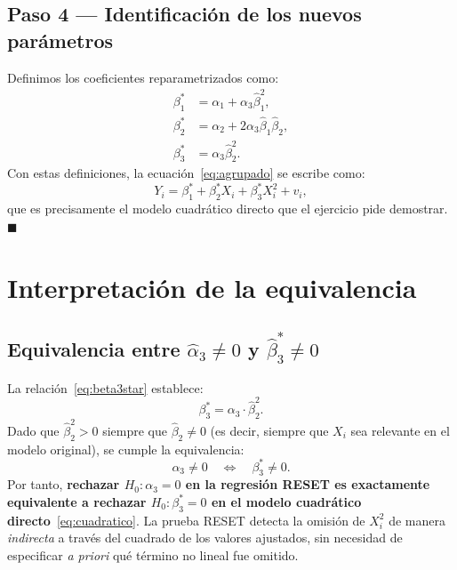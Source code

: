 \documentclass[12pt, letterpaper]{article}
\begin{document}
\subsection{Paso 4 --- Identificación de los nuevos parámetros}

Definimos los coeficientes reparametrizados como:
\begin{align}
  \beta_1^* &= \alpha_1 + \alpha_3\hat{\beta}_1^2,
  \label{eq:beta1star}\\
  \beta_2^* &= \alpha_2 + 2\alpha_3\hat{\beta}_1\hat{\beta}_2,
  \label{eq:beta2star}\\
  \beta_3^* &= \alpha_3\hat{\beta}_2^2.
  \label{eq:beta3star}
\end{align}
Con estas definiciones, la ecuación~\eqref{eq:agrupado} se escribe como:
\begin{equation}
  \boxed{Y_i = \beta_1^* + \beta_2^* X_i + \beta_3^* X_i^2 + v_i,}
  \label{eq:cuadratico}
\end{equation}
que es precisamente el modelo cuadrático directo que el ejercicio pide
demostrar. \hfill $\blacksquare$

\section{Interpretación de la equivalencia}

\subsection{Equivalencia entre $\hat{\alpha}_3 \neq 0$ y $\hat{\beta}_3^* \neq 0$}

La relación~\eqref{eq:beta3star} establece:
\[
  \beta_3^* = \alpha_3 \cdot \hat{\beta}_2^2.
\]
Dado que $\hat{\beta}_2^2 > 0$ siempre que $\hat{\beta}_2 \neq 0$
(es decir, siempre que $X_i$ sea relevante en el modelo original),
se cumple la equivalencia:
\begin{equation}
  \alpha_3 \neq 0
  \quad \Longleftrightarrow \quad
  \beta_3^* \neq 0.
  \label{eq:equivalencia}
\end{equation}
Por tanto, \textbf{rechazar $H_0: \alpha_3 = 0$ en la regresión RESET
es exactamente equivalente a rechazar $H_0: \beta_3^* = 0$ en el modelo
cuadrático directo}~\eqref{eq:cuadratico}. La prueba RESET detecta la
omisión de $X_i^2$ de manera \emph{indirecta} a través del cuadrado
de los valores ajustados, sin necesidad de especificar \textit{a priori}
qué término no lineal fue omitido.
\end{document}
